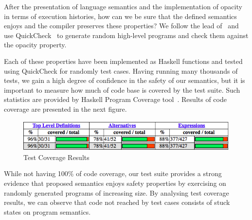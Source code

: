 \documentclass{fundam}
\begin{document}


After the presentation of language semantics and the implementation of
opacity in terms of execution histories, how can we
be sure that the defined semantics enjoys and the compiler preserves these
properties? We follow the lead of~\cite{Hu08} and use QuickCheck~\cite{Claessen00} to
generate random high-level programs and check them against the opacity property.

Each of these properties have been implemented as Haskell functions and tested using QuickCheck for randomly test cases.
Having running many thousands of tests, we gain a high degree of confidence in the safety of our semantics, but it is
important to measure how much of code base is covered by the test suite. Such statistics are provided by Haskell Program Coverage
tool~\cite{Gill2007}. Results of code coverage are presented in the next figure.

\begin{figure}[!htb]
\centering
\includegraphics[scale=0.38]{coverage.png}
\caption{Test Coverage Results}
\label{fig:test-coverage}
\end{figure}
While not having 100\% of code coverage, our test suite provides a strong evidence that proposed semantics enjoys
safety properties by exercising on randomly generated programs of increasing size. By analysing test coverage
results, we can observe that code not reached by test cases consists of stuck states on program semantics.
\end{document}
